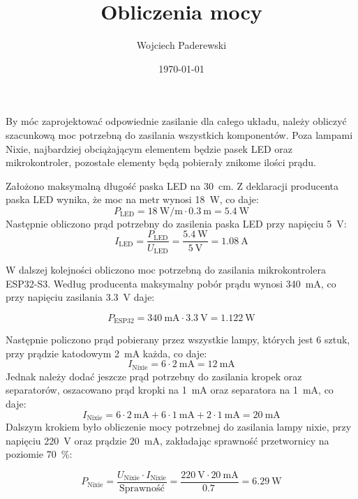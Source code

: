 \documentclass[../main.tex]{subfiles}
\author{Wojciech Paderewski}
\date{\today}
\title{Obliczenia mocy}
\begin{document}
By móc zaprojektować odpowiednie zasilanie dla całego układu, należy obliczyć szacunkową moc potrzebną do zasilania wszystkich komponentów.
Poza lampami Nixie, najbardziej obciążającym elementem będzie pasek LED oraz mikrokontroler, pozostałe elementy będą pobierały znikome ilości prądu.

Założono maksymalną długość paska LED na \SI{30}{\centi\meter}. Z deklaracji producenta paska LED wynika, że moc na metr wynosi \SI{18}{\watt}, co daje:
\begin{equation}
    P_{\text{LED}} = \SI{18}{\watt\per\meter} \cdot \SI{0.3}{\meter} = \SI{5.4}{\watt}
\end{equation}
Następnie obliczono prąd potrzebny do zasilenia paska LED przy napięciu \SI{5}{\volt}:
\begin{equation}
    I_{\text{LED}} = \frac{P_{\text{LED}}}{U_{\text{LED}}} = \frac{\SI{5.4}{\watt}}{\SI{5}{\volt}} = \SI{1.08}{\ampere}
\end{equation}

W dalszej kolejności obliczono moc potrzebną do zasilania mikrokontrolera ESP32-S3. Według producenta maksymalny pobór prądu wynosi \SI{340}{\milli\ampere},
co przy napięciu zasilania \SI{3.3}{\volt} daje:

\begin{equation}
    P_{\text{ESP32}} = \SI{340}{\milli\ampere} \cdot \SI{3.3}{\volt} = \SI{1.122}{\watt}
\end{equation}

Następnie policzono prąd pobierany przez wszystkie lampy, których jest 6 sztuk, przy prądzie katodowym \SI{2}{\milli\ampere} każda, co daje:
\begin{equation}
    I_{\text{Nixie}} = 6 \cdot \SI{2}{\milli\ampere} = \SI{12}{\milli\ampere}
\end{equation}
Jednak należy dodać jeszcze prąd potrzebny do zasilania kropek oraz separatorów, oszacowano prąd kropki na \SI{1}{\milli\ampere} oraz separatora na \SI{1}{\milli\ampere}, co daje:
\begin{equation}
    I_{\text{Nixie}} = 6 \cdot \SI{2}{\milli\ampere} + 6 \cdot \SI{1}{\milli\ampere} + 2 \cdot \SI{1}{\milli\ampere} = \SI{20}{\milli\ampere}
\end{equation}
Dalszym krokiem było obliczenie mocy potrzebnej do zasilania lampy nixie, przy napięciu \SI{220}{\volt} oraz prądzie \SI{20}{\milli\ampere}, zakładając 
sprawność przetwornicy na poziomie \SI{70}{\percent}:

\begin{equation}
    P_{\text{Nixie}} = \frac{U_{\text{Nixie}} \cdot I_{\text{Nixie}}}{\text{Sprawność}} = \frac{\SI{220}{\volt} \cdot \SI{20}{\milli\ampere}}{\SI{0.7}{}} = \SI{6.29}{\watt}
\end{equation}
\end{document}
